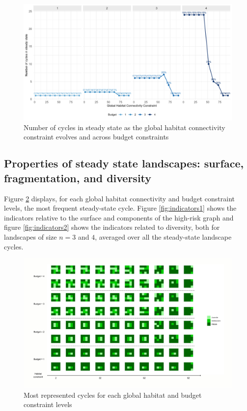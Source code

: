 \begin{figure}[H]
    \centering
    \includegraphics[width = .8\textwidth]{figures/wildland/number_of_cycles.jpg}
    \caption{Number of cycles in steady state as the global habitat connectivity constraint evolves and across budget constraints}
    \label{fig:distrib_cycles}
\end{figure}





\FloatBarrier
\subsection{Properties of steady state landscapes: surface, fragmentation, and diversity}
\label{sec:landscape_char}

Figure \ref{fig:cycles} displays, for each global habitat connectivity and budget constraint levels, the most frequent steady-state cycle.
Figure \ref{fig:indicators1} shows the indicators relative to the surface and components of the high-risk graph and figure \ref{fig:indicators2} shows the indicators related to diversity, both for landscapes of size $n=3$ and $4$, averaged over all the steady-state landscape cycles. 


\begin{figure}[H]
    \centering
    \includegraphics[width=\textwidth]{figures/wildland/full_cycle_canva.jpg}
    \caption{Most represented cycles for each global habitat and budget  constraint levels}
    \label{fig:cycles}
\end{figure}



